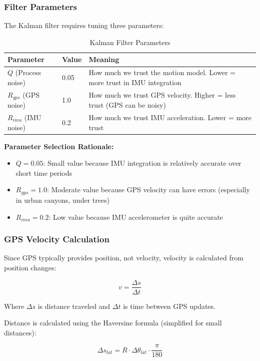 \documentclass[11pt,a4paper]{article}
\begin{document}
\subsubsection{Filter Parameters}
The Kalman filter requires tuning three parameters:

\begin{table}[H]
\centering
\begin{tabular}{@{}llp{8cm}@{}}
\toprule
\textbf{Parameter} & \textbf{Value} & \textbf{Meaning} \\
\midrule
$Q$ (Process noise) & 0.05 & How much we trust the motion model. Lower = more trust in IMU integration \\
$R_{gps}$ (GPS noise) & 1.0 & How much we trust GPS velocity. Higher = less trust (GPS can be noisy) \\
$R_{imu}$ (IMU noise) & 0.2 & How much we trust IMU acceleration. Lower = more trust \\
\bottomrule
\end{tabular}
\caption{Kalman Filter Parameters}
\end{table}

\textbf{Parameter Selection Rationale:}
\begin{itemize}
    \item \textbf{$Q = 0.05$}: Small value because IMU integration is relatively accurate over short time periods
    \item \textbf{$R_{gps} = 1.0$}: Moderate value because GPS velocity can have errors (especially in urban canyons, under trees)
    \item \textbf{$R_{imu} = 0.2$}: Low value because IMU accelerometer is quite accurate
\end{itemize}

\subsubsection{GPS Velocity Calculation}
Since GPS typically provides position, not velocity, velocity is calculated from position changes:

\begin{equation}
v = \frac{\Delta s}{\Delta t}
\end{equation}

Where $\Delta s$ is distance traveled and $\Delta t$ is time between GPS updates.

Distance is calculated using the Haversine formula (simplified for small distances):

\begin{equation}
\Delta s_{lat} = R \cdot \Delta \theta_{lat} \cdot \frac{\pi}{180}
\end{equation}
\end{document}
